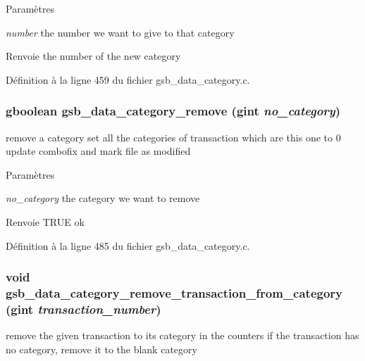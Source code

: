 \begin{DoxyParams}{Paramètres}
\item[{\em number}]the number we want to give to that category\end{DoxyParams}
\begin{DoxyReturn}{Renvoie}
the number of the new category 
\end{DoxyReturn}


Définition à la ligne 459 du fichier gsb\_\-data\_\-category.c.

\subsubsection[{gsb\_\-data\_\-category\_\-remove}]{\setlength{\rightskip}{0pt plus 5cm}gboolean gsb\_\-data\_\-category\_\-remove (gint {\em no\_\-category})}\label{gsb__data__category_8c_a6c7a65577a171613fef900fc5f2a3bc3}
remove a category set all the categories of transaction which are this one to 0 update combofix and mark file as modified


\begin{DoxyParams}{Paramètres}
\item[{\em no\_\-category}]the category we want to remove\end{DoxyParams}
\begin{DoxyReturn}{Renvoie}
TRUE ok 
\end{DoxyReturn}


Définition à la ligne 485 du fichier gsb\_\-data\_\-category.c.

\subsubsection[{gsb\_\-data\_\-category\_\-remove\_\-transaction\_\-from\_\-category}]{\setlength{\rightskip}{0pt plus 5cm}void gsb\_\-data\_\-category\_\-remove\_\-transaction\_\-from\_\-category (gint {\em transaction\_\-number})}\label{gsb__data__category_8c_aa19788e0032e0cac0e125c478c5a3b06}
remove the given transaction to its category in the counters if the transaction has no category, remove it to the blank category


